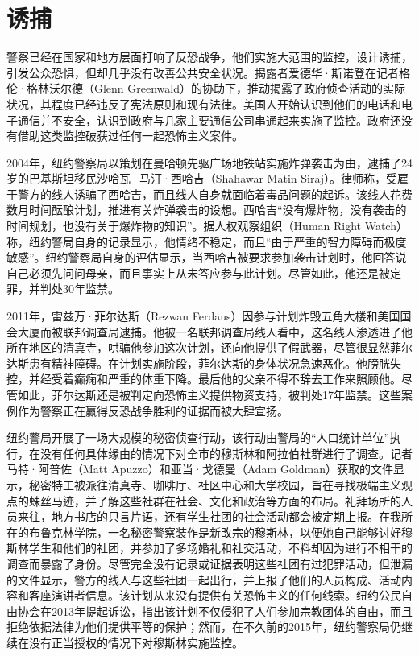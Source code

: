 \documentclass[fontset=fandol, a4paper, 12pt, openright]{ctexbook}
\begin{document}
\section{诱捕}

警察已经在国家和地方层面打响了反恐战争，他们实施大范围的监控，设计诱捕，引发公众恐惧，但却几乎没有改善公共安全状况。揭露者爱德华·斯诺登在记者格伦·格林沃尔德（Glenn Greenwald）的协助下，推动揭露了政府侦查活动的实际状况，其程度已经违反了宪法原则和现有法律。美国人开始认识到他们的电话和电子通信并不安全，认识到政府与几家主要通信公司串通起来实施了监控。政府还没有借助这类监控破获过任何一起恐怖主义案件。

2004年，纽约警察局以策划在曼哈顿先驱广场地铁站实施炸弹袭击为由，逮捕了24岁的巴基斯坦移民沙哈瓦·马汀·西哈吉（Shahawar Matin Siraj）。律师称，受雇于警方的线人诱骗了西哈吉，而且线人自身就面临着毒品问题的起诉。该线人花费数月时间酝酿计划，推进有关炸弹袭击的设想。西哈吉“没有爆炸物，没有袭击的时间规划，也没有关于爆炸物的知识”。据人权观察组织（Human Right Watch）称，纽约警局自身的记录显示，他情绪不稳定，而且“由于严重的智力障碍而极度敏感”。纽约警察局自身的评估显示，当西哈吉被要求参加袭击计划时，他回答说自己必须先问问母亲，而且事实上从未答应参与此计划。尽管如此，他还是被定罪，并判处30年监禁。

2011年，雷兹万·菲尔达斯（Rezwan Ferdaus）因参与计划炸毁五角大楼和美国国会大厦而被联邦调查局逮捕。他被一名联邦调查局线人看中，这名线人渗透进了他所在地区的清真寺，哄骗他参加这次计划，还向他提供了假武器，尽管很显然菲尔达斯患有精神障碍。在计划实施阶段，菲尔达斯的身体状况急速恶化。他膀胱失控，并经受着癫痫和严重的体重下降。最后他的父亲不得不辞去工作来照顾他。尽管如此，菲尔达斯还是被判定向恐怖主义提供物资支持，被判处17年监禁。这些案例作为警察正在赢得反恐战争胜利的证据而被大肆宣扬。

纽约警局开展了一场大规模的秘密侦查行动，该行动由警局的“人口统计单位”执行，在没有任何具体缘由的情况下对全市的穆斯林和阿拉伯社群进行了调查。记者马特·阿普佐（Matt Apuzzo）和亚当·戈德曼（Adam Goldman）获取的文件显示，秘密特工被派往清真寺、咖啡厅、社区中心和大学校园，旨在寻找极端主义观点的蛛丝马迹，并了解这些社群在社会、文化和政治等方面的布局。礼拜场所的人员来往，地方书店的只言片语，还有学生社团的社会活动都会被定期上报。在我所在的布鲁克林学院，一名秘密警察装作是新改宗的穆斯林，以便她自己能够讨好穆斯林学生和他们的社团，并参加了多场婚礼和社交活动，不料却因为进行不相干的调查而暴露了身份。尽管完全没有记录或证据表明这些社团有过犯罪活动，但泄漏的文件显示，警方的线人与这些社团一起出行，并上报了他们的人员构成、活动内容和客座演讲者信息。该计划从来没有提供有关恐怖主义的任何线索。纽约公民自由协会在2013年提起诉讼，指出该计划不仅侵犯了人们参加宗教团体的自由，而且拒绝依据法律为他们提供平等的保护；然而，在不久前的2015年，纽约警察局仍继续在没有正当授权的情况下对穆斯林实施监控。
\end{document}
